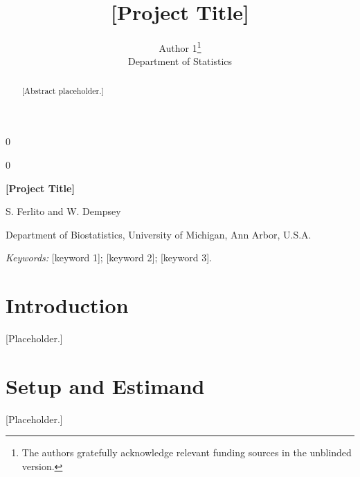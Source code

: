 \documentclass[12pt]{article}
\newcommand{\blind}{0}
\def\spacingset#1{\renewcommand{\baselinestretch}{#1}\small\normalsize}
\begin{document}
\blind
{
  \title{\bf [Project Title]}
  \author{Author 1\thanks{The authors gratefully acknowledge relevant funding sources in the unblinded version.}\\
    Department of Statistics}
  \maketitle
} \fi

\blind
{
  \bigskip
  \bigskip
  \bigskip
  \begin{center}
    {\LARGE\bf [Project Title]}

    \medskip
    S. Ferlito and W. Dempsey

    Department of Biostatistics, University of Michigan, Ann Arbor, U.S.A.
  \end{center}
  \medskip
} \fi

\begin{abstract}
[Abstract placeholder.]
\end{abstract}

\noindent%
{\it Keywords:} [keyword 1]; [keyword 2]; [keyword 3].
\vfill

\newpage
\spacingset{1.45} %

\section{Introduction}
\label{sec:intro}
[Placeholder.]

\section{Setup and Estimand}
\label{sec:setup}
[Placeholder.]
\end{document}
